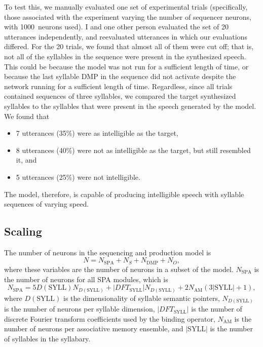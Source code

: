 To test this, we manually evaluated
one set of experimental trials
(specifically, those associated with
the experiment varying the number of
sequencer neurons,
with 1000~neurons used).
I and one other person evaluated
the set of 20 utterances independently,
and reevaluated utterances
in which our evaluations differed.
For the 20 trials,
we found that
almost all of them were cut off;
that is, not all of the syllables
in the sequence were present
in the synthesized speech.
This could be because the model
was not run for a sufficient length of time,
or because the last syllable DMP in the sequence
did not activate
despite the network running
for a sufficient length of time.
Regardless, since all trials
contained sequences of three syllables,
we compared the target synthesized syllables
to the syllables that were present
in the speech generated by the model.
We found that
\begin{itemize}
  \item 7 utterances (35\%) were as intelligible as the target,
  \item 8 utterances (40\%) were not as intelligible as the target,
    but still resembled it, and
  \item 5 utterances (25\%) were not intelligible.
\end{itemize}

The model, therefore,
is capable of producing intelligible speech
with syllable sequences of varying speed.

\subsection{Scaling}
\label{sec:res-prod-scaling}

The number of neurons in the
sequencing and production model is
\begin{equation}
  N = N_{\text{SPA}} + N_S + N_{\text{DMP}} + N_O,
\end{equation}
where these variables
are the number of neurons in
a subset of the model.
$N_{\text{SPA}}$ is the number of
neurons for all SPA modules,
which is
\begin{equation}
  N_{\text{SPA}} = 5 D(\text{SYLL}) N_{D(\text{SYLL})} +
      |DFT_{\text{SYLL}}| N_{D(\text{SYLL})}
      + 2 N_{\text{AM}} (3 |\text{SYLL}| + 1),
\end{equation}
where $D(\text{SYLL})$ is the dimensionality
of syllable semantic pointers,
$N_{D(\text{SYLL})}$ is the number of neurons
per syllable dimension,
$|DFT_{\text{SYLL}}|$ is the number of
discrete Fourier transform coefficients
used by the binding operator,
$N_{\text{AM}}$ is the number of neurons
per associative memory ensemble,
and $|\text{SYLL}|$ is the number of
syllables in the syllabary.

